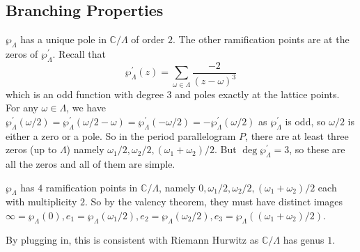 \subsection{Branching Properties}
$\wp_\Lambda$ has a unique pole in $\mathbb C/\Lambda$ of order $2$.
The other ramification points are at the zeros of $\wp_\Lambda^\prime$.
Recall that
$$\wp_\Lambda^\prime(z)=\sum_{\omega\in\Lambda}\frac{-2}{(z-\omega)^3}$$
which is an odd function with degree $3$ and poles exactly at the lattice points.
For any $\omega\in\Lambda$, we have $\wp_\Lambda^\prime(\omega/2)=\wp_\Lambda^\prime(\omega/2-\omega)=\wp_\Lambda^\prime(-\omega/2)=-\wp_\Lambda^\prime(\omega/2)$ as $\wp_\Lambda^\prime$ is odd, so $\omega/2$ is either a zero or a pole.
So in the period parallelogram $P$, there are at least three zeros (up to $\Lambda$) namely $\omega_1/2,\omega_2/2,(\omega_1+\omega_2)/2$.
But $\deg\wp_\Lambda^\prime=3$, so these are all the zeros and all of them are simple.
\begin{remark}
    $\wp_\Lambda$ has $4$ ramification points in $\mathbb C/\Lambda$, namely $0,\omega_1/2,\omega_2/2,(\omega_1+\omega_2)/2$ each with multiplicity $2$.
    So by the valency theorem, they must have distinct images $\infty=\wp_\Lambda(0),e_1=\wp_\Lambda(\omega_1/2),e_2=\wp_\Lambda(\omega_2/2),e_3=\wp_\Lambda((\omega_1+\omega_2)/2)$.
\end{remark}
\begin{remark}
    By plugging in, this is consistent with Riemann Hurwitz as $\mathbb C/\Lambda$ has genus $1$.
\end{remark}